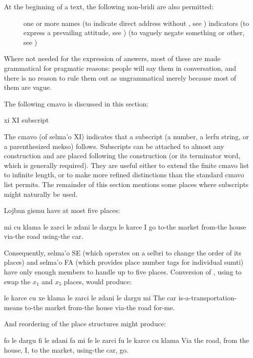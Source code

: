 At the beginning of a text, the following non-bridi are also
    permitted:
\begin{description}
\item[] one or more names (to indicate direct address without , see ) indicators (to express a prevailing attitude, see )  (to vaguely negate something or other, see )

\end{description}

Where not needed for the expression of answers, most of
    these are made grammatical for pragmatic reasons: people will
    say them in conversation, and there is no reason to rule them
    out as ungrammatical merely because most of them are vague.



The following cmavo is discussed in this section:

   xi  XI  subscript

The cmavo  (of selma'o XI) indicates that a subscript (a
    number, a lerfu string, or a parenthesized mekso) follows.
    Subscripts can be attached to almost any construction and are
    placed following the construction (or its terminator word,
    which is generally required). They are useful either to extend
    the finite cmavo list to infinite length, or to make more
    refined distinctions than the standard cmavo list permits. The
    remainder of this section mentions some places where subscripts
    might naturally be used. 

Lojban gismu have at most five places:
\begin{example}
mi cu klama le zarci le zdani\n
\T	le dargu le karce\n
I go to-the market from-the house\n
\T	via-the road using-the car.
\end{example}

Consequently, selma'o SE (which operates on a selbri to
    change the order of its places) and selma'o FA (which provides
    place number tags for individual sumti) have only enough
    members to handle up to five places. Conversion of , using  to swap the $x_1$ and
    $x_5$ places, would produce:
\begin{example}
le karce cu xe klama le zarci\n
\T	le zdani le dargu mi\n
The car is-a-transportation-means to-the market\n
\T	from-the house via-the road for-me.
\end{example}

And reordering of the place structures might produce:
\begin{example}
fo le dargu fi le zdani fa mi fe le zarci\n
\T	fu le karce cu klama\n
Via the road, from the house, I, to the market,\n
\T	using-the car, go.
\end{example}

